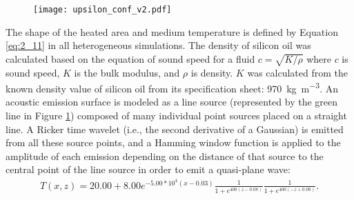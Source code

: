         \begin{figure}[htbp]
                \centerline{\texttt{[image: upsilon\_conf\_v2.pdf]}}
            \label{fig:upsilon_conf}
        \end{figure}

The shape of the heated area and medium
temperature is defined by Equation \ref{eq:2_11} in all heterogeneous simulations.
The density of silicon oil was calculated based on the equation of sound speed for a fluid $c=\sqrt{K/\rho}$
where $c$ is sound speed, $K$ is the bulk modulus, and $\rho$ is density.
$K$ was calculated from the known density value of silicon oil from its specification sheet: \SI{970}{\kilo\gram\per\cubic\metre}.
An acoustic emission surface is modeled as a line source (represented by the green line in Figure
\ref{fig:upsilon_conf}) composed of many individual point sources placed on a straight line. A Ricker time wavelet (i.e., the second derivative of a Gaussian)
is emitted from all these source points, and a Hamming window
function is applied to the amplitude of each emission depending on the distance of that source to the central point of the line source in order to emit a
quasi-plane wave:
        \begin{align} \label{eq:2_11}
            T(x,z)=20.00+8.00e^{-5.00*10^4(x-0.03)}\frac{1}{1+e^{400(z-0.08)}}\frac{1}{1+e^{400(-z+0.08)}}.
        \end{align}

